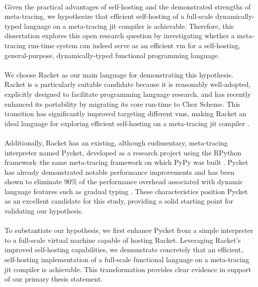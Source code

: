         \paragraph{}%
            Given the practical advantages of self-hosting and the demonstrated strengths of meta-tracing, we hypothesize that efficient self-hosting of a full-scale dynamically-typed language on a meta-tracing \gls{jit} compiler is achievable. Therefore, this dissertation explores this open research question by investigating whether a meta-tracing run-time system can indeed serve as an efficient \gls{vm} for a self-hosting, general-purpose, dynamically-typed functional programming language.

        \paragraph{}%
            We choose Racket as our main language for demonstrating this hypothesis. Racket is a particularly suitable candidate because it is reasonably well-adopted, explicitly designed to facilitate programming language research, and has recently enhanced its portability by migrating its core run-time to Chez Scheme. This transition has significantly improved targeting different \glspl{vm}, making Racket an ideal language for exploring efficient self-hosting on a meta-tracing \gls{jit} compiler \cite{icfp2019}.

        \paragraph{}%
            Additionally, Racket has an existing, although rudimentary, meta-tracing interpreter named Pycket, developed as a research project using the RPython framework--the same meta-tracing framework on which PyPy was built \cite{bolzPhDThesis,bolzMetatracingMakesFast2014}. Pycket has already demonstrated notable performance improvements and has been shown to eliminate 90\% of the performance overhead associated with dynamic language features such as gradual typing \cite{pycketmain,pycketmain2}. These characteristics position Pycket as an excellent candidate for this study, providing a solid starting point for validating our hypothesis.

        \paragraph{}%
            To substantiate our hypothesis, we first enhance Pycket from a simple interpreter to a full-scale virtual machine capable of hosting Racket. Leveraging Racket's improved self-hosting capabilities, we demonstrate concretely that an efficient, self-hosting implementation of a full-scale functional language on a meta-tracing \gls{jit} compiler is achievable. This transformation provides clear evidence in support of our primary thesis statement.

